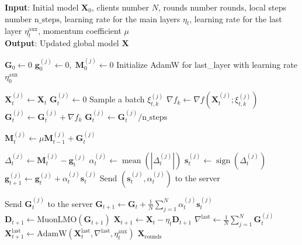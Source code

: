 \documentclass[letterpaper]{article} %
\begin{document}
\begin{algorithm}[!t]
\caption{Federated EF21-MuonUSign}
\label{ef21_alg}
\textbf{Input}: Initial model $\mathbf{X}_0$, clients number $N$, rounds number $\mathrm{rounds}$, local steps number $\mathrm{n\_steps}$, learning rate for the main layers $\eta_t$, learning rate for the last layer $\eta_t^{\text{aux}}$,  momentum coefficient $\mu$ \\
\textbf{Output}: Updated global model $\mathbf{X}$
\begin{algorithmic}[1]
\State $\mathbf{G}_0 \gets 0$ 
    \State $\mathbf{g}_0^{(j)} \gets 0, \; \mathbf{M}_0^{(j)} \gets 0$ 
\EndFor
\State Initialize AdamW for last\_layer with learning rate $\eta^{\mathrm{aux}}_0$

     
        \State $\mathbf{X}_t^{(j)} \gets \mathbf{X}_t$ 
        \State $\mathbf{G}_t^{(j)} \gets 0$
            \State Sample a batch $\xi_{t,k}^{(j)}$
            \State $\nabla f_k \gets \nabla f(\mathbf{X}_t^{(j)}; \xi_{t,k}^{(j)})$
            \State $\mathbf{G}_t^{(j)} \gets \mathbf{G}_t^{(j)} + \nabla f_k$
        \EndFor
        \State $\mathbf{G}_t^{(j)} \gets \mathbf{G}_t^{(j)} / \mathrm{n\_steps}$ 
        
        \State $\mathbf{M}_t^{(j)} \gets \mu \mathbf{M}_{t-1}^{(j)} + \mathbf{G}_t^{(j)}$
        
            \State $\Delta_t^{(j)} \gets \mathbf{M}_t^{(j)} - \mathbf{g}_t^{(j)}$ 
            \State $\alpha_t^{(j)} \gets \operatorname{mean}(|\Delta_t^{(j)}|)$ 
            \State $\mathbf{s}_t^{(j)} \gets \operatorname{sign}(\Delta_t^{(j)})$ 
            \State $\mathbf{g}_{t+1}^{(j)} \gets \mathbf{g}_t^{(j)} + \alpha_t^{(j)} \mathbf{s}_t^{(j)}$ 
            \State Send $(\mathbf{s}_t^{(j)}, \alpha_t^{(j)})$ to the server
        \EndFor
        
            \State Send $\mathbf{G}_t^{(j)}$ to the server
        \EndFor
    \EndFor
    \State $\mathbf{G}_{t+1} \gets \mathbf{G}_t + \frac{1}{N} \sum_{j=1}^N \alpha_t^{(j)} \mathbf{s}_t^{(j)}$ 
        \State $\mathbf{D}_{t+1} \gets \mathrm{MuonLMO}(\mathbf{G}_{t+1})$
        \State $\mathbf{X}_{t+1} \gets \mathbf{X}_t - \eta_t \mathbf{D}_{t+1}$ 
    \EndFor
    \State $\nabla^{\text{last}} \gets \frac{1}{N} \sum_{j=1}^N \mathbf{G}_t^{(j)}$
    \State $\mathbf{X}_{t+1}^{\text{last}} \gets \text{AdamW}(\mathbf{X}_t^{\text{last}}, \nabla^{\text{last}}, \eta_t^{\text{aux}})$ 
\EndFor
\State \Return $\mathbf{X}_{\mathrm{rounds}}$
\end{algorithmic}
\end{algorithm}
\end{document}
